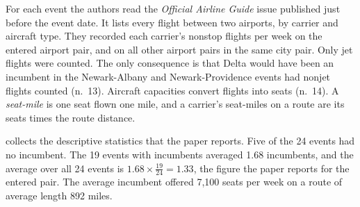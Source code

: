 For each event the authors read the \emph{Official Airline Guide} issue published just before the
event date. It lists every flight between two airports, by carrier and aircraft type. They recorded
each carrier's nonstop flights per week on the entered airport pair, and on all other airport pairs
in the same city pair. Only jet flights were counted. The only consequence is that Delta would have
been an incumbent in the Newark-Albany and Newark-Providence events had nonjet flights counted
(n.~13). Aircraft capacities convert flights into seats (n.~14). A \emph{seat-mile} is one
seat flown one mile, and a carrier's seat-miles on a route are its seats times the route distance.

 collects the descriptive statistics that the paper reports. Five of the 24
events had no incumbent. The 19 events with incumbents averaged 1.68 incumbents, and the average over
all 24 events is $1.68\times\frac{19}{24}=1.33$, the figure the paper reports for the entered pair. The
average incumbent offered 7,100 seats per week on a route of average length 892 miles.

